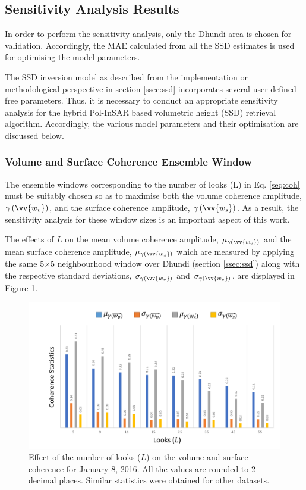 \documentclass[12pt]{elsarticle}
\numberwithin{equation}{section}
\numberwithin{figure}{section}
\numberwithin{table}{section}
\begin{document}
\subsection{Sensitivity Analysis Results}
\label{ssec:sar}
In order to perform the sensitivity analysis, only the Dhundi area is chosen for validation. Accordingly, the MAE calculated from all the SSD estimates is used for optimising the model parameters.

The SSD inversion model as described from the implementation or methodological perspective in section \ref{ssec:ssd} incorporates several user-defined free parameters. Thus, it is necessary to conduct an appropriate sensitivity analysis for the hybrid Pol-InSAR based volumetric height (SSD) retrieval algorithm. Accordingly, the various model parameters and their optimisation are discussed below.

\subsubsection{Volume and Surface Coherence Ensemble Window}

The ensemble windows corresponding to the number of looks (L) in Eq. \eqref{seq:coh} must be suitably chosen so as to maximise both the volume coherence amplitude, $\gamma\left(\vv{w_v}\right)$, and the surface coherence amplitude, $\gamma\left(\vv{w_s}\right)$. As a result, the sensitivity analysis for these window sizes is an important aspect of this work.

The effects of $L$ on the mean volume coherence amplitude, $\mu_{\gamma\left(\vv{w_v}\right)}$ and the mean surface coherence amplitude, $\mu_{\gamma\left(\vv{w_s}\right)}$ which are measured by applying the same 5$\times$5 neighbourhood window over Dhundi (section \ref{ssec:ssd}) along with the respective standard deviations, $\sigma_{\gamma\left(\vv{w_v}\right)}$ and $\sigma_{\gamma\left(\vv{w_v}\right)}$, are displayed in Figure \ref{fig:ssd_coh}. 

\begin{figure}[htb]
    \centering
    \includegraphics[width=\textwidth]{Figures/Results/Coh_SSD.png}
    \caption{\doublespacing Effect of the number of looks ($L$) on the volume and surface coherence for January 8, 2016. All the values are rounded to 2 decimal places. Similar statistics were obtained for other datasets.}
    \label{fig:ssd_coh}
\end{figure}
\end{document}

